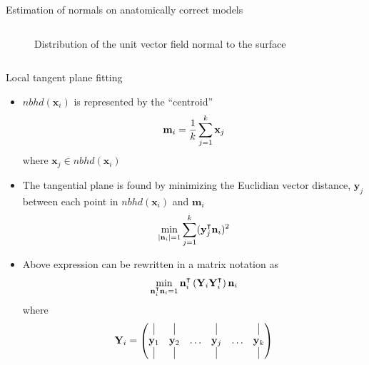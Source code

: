 \documentclass[xcolor=dvipsnames,10pt]{beamer}
\begin{document}
\begin{frame}{Estimation of normals on anatomically correct models}
\begin{columns}[c]
\begin{column}{0.5\textwidth}
\begin{onlyenv}
\begin{center}
\begin{figure}
                    \caption{Distribution of the unit vector field normal to the surface}
                \end{figure}
                \end{center}
            \end{onlyenv}
        \end{column}
    \end{columns} 
\end{frame}

\begin{frame}{Local tangent plane fitting}
    \begin{itemize}
        \item $nbhd(\mathbf{x}_i)$ is represented by the ``centroid''
        \begin{equation*}
            \centering
            \mathbf{m}_i = \frac{1}{k} \sum_{j=1}^k \mathbf{x}_j
        \end{equation*}
        where $\mathbf{x}_j \in nbhd(\mathbf{x}_i)$
        \item The tangential plane is found by minimizing the Euclidian vector distance, $\mathbf{y}_j$ between each point in $nbhd(\mathbf{x}_i)$ and $\mathbf{m}_i$
        \begin{equation*}
            \centering
            \min_{|\mathbf{n}_i|=1} \sum_{j=1}^{k} (\mathbf{y}_j^\intercal \mathbf{n}_i)^2
        \end{equation*}
        \item Above expression can be rewritten in a matrix notation as
        \begin{equation*}
            \centering
            \min_{\mathbf{n}_i^\intercal \mathbf{n}_i = 1} \mathbf{n}_i^\intercal \left( \mathbf{Y}_i \mathbf{Y}_i^\intercal \right) \mathbf{n}_i
        \end{equation*}
        where
        \begin{equation*}
            \centering
            \mathbf{Y}_i = \begin{pmatrix}
            \vline & \vline &  & \vline &  & \vline \\
            \mathbf{y}_1 & \mathbf{y}_2 & \dots & \mathbf{y}_j & \dots & \mathbf{y}_k \\
            \vline & \vline &  & \vline &  & \vline
            \end{pmatrix}
        \end{equation*}
    \end{itemize}
\end{frame}
\end{document}
